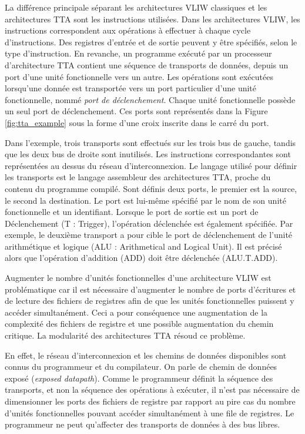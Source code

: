 La différence principale séparant les architectures VLIW classiques et les architectures TTA sont les instructions utilisées. Dans les architectures VLIW, les instructions correspondent aux opérations à effectuer à chaque cycle d'instructions. Des registres d'entrée et de sortie peuvent y être spécifiés, selon le type d'instruction. En revanche, un programme exécuté par un processeur d'architecture TTA contient une séquence de transports de données, depuis un port d'une unité fonctionnelle vers un autre. Les opérations sont exécutées lorsqu'une donnée est transportée vers un port particulier d'une unité fonctionnelle, nommé \textit{port de déclenchement}. Chaque unité fonctionnelle possède un seul port de déclenchement. Ces ports sont représentés dans la Figure \ref{fig:tta_example} sous la forme d'une croix inscrite dans le carré du port.

Dans l'exemple, trois transports sont effectués sur les trois bus de gauche, tandis que les deux bus de droite sont inutilisés. Les instructions correspondantes sont représentées au dessus du réseau d'interconnexion. Le langage utilisé pour définir les transports est le langage assembleur des architectures TTA, proche du contenu du programme compilé. Sont définis deux ports, le premier est la source, le second la destination. Le port est lui-même spécifié par le nom de son unité fonctionnelle et un identifiant. Lorsque le port de sortie est un port de Déclenchement (T : Trigger), l'opération déclenchée est également spécifiée. Par exemple, le deuxième transport a pour cible le port de déclenchement de l'unité arithmétique et logique (ALU : Arithmetical and Logical Unit). Il est précisé alors que l'opération d'addition (ADD) doit être déclenchée (ALU.T.ADD).

Augmenter le nombre d'unités fonctionnelles d'une architecture VLIW est problématique car il est nécessaire d'augmenter le nombre de ports d'écritures et de lecture des fichiers de registres afin de que les unités fonctionnelles puissent y accéder simultanément. Ceci a pour conséquence une augmentation de la complexité des fichiers de registre et une possible augmentation du chemin critique.
La modularité des architectures TTA résoud ce problème.

En effet, le réseau d'interconnexion et les chemins de données disponibles sont connus du programmeur et du compilateur. On parle de \og chemin de données exposé \fg (\textit{exposed datapath}). Comme le programmeur définit la séquence des transports, et non la séquence des opérations à exécuter, il n'est pas nécessaire de dimensionner les ports des fichiers de registre par rapport au pire cas du nombre d'unités fonctionnelles pouvant accéder simultanément à une file de registres. Le programmeur ne peut qu'affecter des transports de données à des bus libres.

